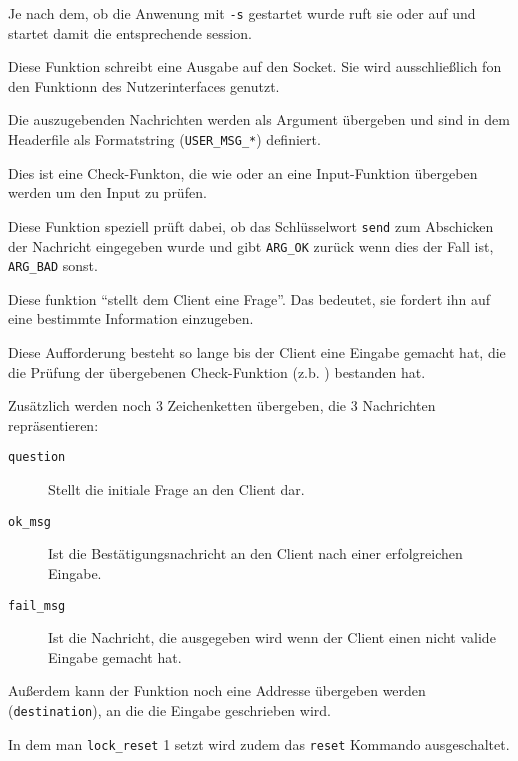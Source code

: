 Je nach dem, ob die Anwenung mit \texttt{-s} gestartet wurde ruft sie  oder  auf und startet damit die entsprechende session.


\label{fn:user_write_msg}
Diese Funktion schreibt eine Ausgabe auf den Socket. Sie wird ausschließlich fon den Funktionn des Nutzerinterfaces genutzt.

Die auszugebenden Nachrichten werden als Argument \"{u}bergeben und sind in dem Headerfile  als Formatstring (\texttt{USER\_MSG\_*}) definiert.

\label{fn:user_check_confirm}
Dies ist eine Check-Funkton, die wie  oder  an eine Input-Funktion \"{u}bergeben werden um den Input zu pr\"{u}fen.

Diese Funktion speziell pr\"{u}ft dabei, ob das Schl\"{u}sselwort \texttt{send} zum Abschicken der Nachricht eingegeben wurde und gibt \texttt{ARG\_OK} zur\"{u}ck wenn dies der Fall ist, \texttt{ARG\_BAD} sonst.

\label{fn:user_ask_client}
Diese funktion ``stellt dem Client eine Frage''. Das bedeutet, sie fordert ihn auf eine bestimmte Information einzugeben.

Diese Aufforderung besteht so lange bis der Client eine Eingabe gemacht hat, die die Pr\"{u}fung der \"{u}bergebenen Check-Funktion (z.b. ) bestanden hat.

Zus\"{a}tzlich werden noch 3 Zeichenketten \"{u}bergeben, die 3 Nachrichten repr\"{a}sentieren:
\begin{description}
  \item[\texttt{question}] Stellt die initiale Frage an den Client dar.
  \item[\texttt{ok\_msg}] Ist die Best\"{a}tigungsnachricht an den Client nach einer erfolgreichen Eingabe.
  \item[\texttt{fail\_msg}] Ist die Nachricht, die ausgegeben wird wenn der Client einen nicht valide Eingabe gemacht hat. 
\end{description}

Außerdem kann der Funktion noch eine Addresse \"{u}bergeben werden (\texttt{destination}), an die die Eingabe geschrieben wird.

In dem man \texttt{lock\_reset} 1 setzt wird zudem das \texttt{reset} Kommando ausgeschaltet.


